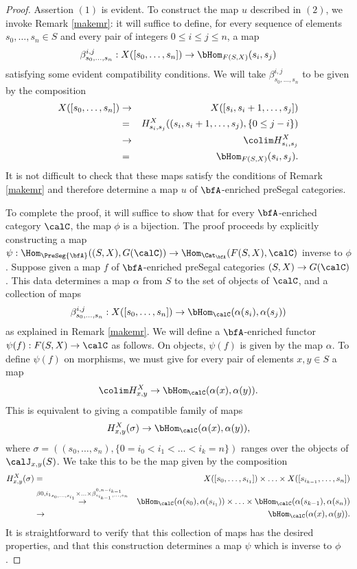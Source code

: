 \begin{proof}
Assertion $(1)$ is evident. To construct the map $u$ described in $(2)$, we invoke Remark \ref{makemr}: it will suffice to define, for every sequence of elements $s_0, \ldots, s_n \in S$ and every
pair of integers $0 \leq i \leq j \leq n$, a map
$$ \beta^{i,j}_{s_0, \ldots, s_n}: X( [s_0, \ldots, s_n] )
\rightarrow \bHom_{ F(S,X)}( s_i, s_j)$$
satisfying some evident compatibility conditions. We will take $\beta^{i,j}_{s_0, \ldots, s_n}$ to be
given by the composition
\begin{align*}
X( [s_0, \ldots, s_n] ) & \rightarrow & X( [ s_i, s_i+1, \ldots, s_j ]) \\
& = & H^{X}_{s_i, s_j}( (s_i, s_i + 1, \ldots, s_j), \{ 0 \leq j-i \} ) \\
& \rightarrow & \colim H^{X}_{s_i, s_j} \\
& = & \bHom_{ F(S,X)}( s_i, s_j). \end{align*}
It is not difficult to check that these maps satisfy the conditions of Remark \ref{makemr} and therefore determine a map $u$ of $\bfA$-enriched preSegal categories. 

To complete the proof, it will suffice to show that for every $\bfA$-enriched category $\calC$, the map $\phi$ is a bijection. The proof proceeds by explicitly constructing a map 
$\psi: \Hom_{ \PreSeg{\bfA}}( (S,X), G(\calC) ) \rightarrow \Hom_{\Cat_{\bfA}}( F(S,X), \calC)$ inverse
to $\phi$. Suppose given a map $f$ of $\bfA$-enriched preSegal categories $(S,X) \rightarrow G(\calC)$.
This data determines a map $\alpha$ from $S$ to the set of objects of $\calC$, and a collection of maps
$$ \beta^{i,j}_{s_0, \ldots, s_n}: X( [s_0, \ldots, s_n]) \rightarrow \bHom_{\calC}( \alpha(s_i), \alpha(s_j) )$$
as explained in Remark \ref{makemr}. We will define a $\bfA$-enriched functor $\psi(f): F(S,X) \rightarrow \calC$ as follows. On objects, $\psi(f)$ is given by the map $\alpha$. To define
$\psi(f)$ on morphisms, we must give for every pair of elements $x,y \in S$ a map
$$ \colim H^{X}_{x,y} \rightarrow \bHom_{\calC}( \alpha(x), \alpha(y) ).$$
This is equivalent to giving a compatible family of maps
$$ H^{X}_{x,y}(\sigma) \rightarrow \bHom_{\calC}( \alpha(x), \alpha(y) ),$$
where $\sigma = ( (s_0, \ldots, s_n ), \{ 0 = i_0 < i_1 < \ldots < i_k = n\} )$ ranges over
the objects of $\calJ_{x,y}(S)$. We take this to be the map given by the composition
\begin{align*}
H^{X}_{x,y}(\sigma) & = & X([s_0, \ldots, s_{i_1}]) \times \ldots \times X( [s_{i_{k-1}}, \ldots, s_n])
\\
& \stackrel{ \beta{0, i_1}_{ s_0, \ldots, s_{i_1}} \times \ldots \times \beta^{0, n- i_{k-1}}_{ s_{i_{k-1}}, \ldots, s_{n} }}{\rightarrow} & \bHom_{\calC}( \alpha(s_0), \alpha(s_{i_1})) \times \ldots
\times \bHom_{\calC}( \alpha(s_{k-1}), \alpha(s_n) ) \\
& \rightarrow & \bHom_{\calC}( \alpha(x), \alpha(y) ). \end{align*}
It is straightforward to verify that this collection of maps has the desired properties, and that this construction determines a map $\psi$ which is inverse to $\phi$.
\end{proof}

